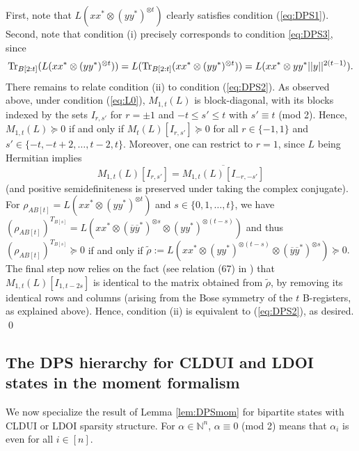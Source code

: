 \documentclass[11pt]{article}
\makeatletter
\newcommand{\N}{\ensuremath{\mathbb{N}}}   %
\newcommand{\Tr}{\text{\rm Tr}}
\newcommand{\oy}{\overline y}
\newcommand{\ot}{\otimes}
\theoremstyle{plain}
\renewenvironment{proof}[1][\proofname]{%
  \par
  \pushQED{}%
  \normalfont
  \topsep6\p@\@plus6\p@
  \trivlist
  \item[\hskip\labelsep\itshape #1\@addpunct{.}]%
}{%
  \popQED
  \endtrivlist
}
\makeatother
\begin{document}
\begin{proof}
First, note that  $L(xx^*\ot (yy^*)^{\ot t})$ clearly satisfies condition (\ref{eq:DPS1}).
Second, note that condition (i) precisely corresponds to condition \eqref{eq:DPS3}, since $$\Tr_{B[2:t]}(L(xx^*\ot(yy^*)^{\ot t}))=L(\Tr_{B[2:t]}(xx^*\ot(yy^*)^{\ot t}))=L(xx^*\ot yy^*||y||^{2(t-1)}).$$
There remains to relate condition (ii) to condition (\ref{eq:DPS2}).
  As observed above,  under condition (\ref{eq:L0}), $M_{1,t}(L)$ is block-diagonal, with its blocks indexed by the sets $I_{r,s'}$ for $r=\pm 1$ and $-t\le s'\le t$ with $s'\equiv t$ (mod 2). Hence,  $M_{1,t}(L)\succeq 0$  if and only if $M_t(L)[I_{r,s'}]\succeq 0$  for all $r\in\{-1,1\}$ and $s'\in\{-t, -t+2,\dots,t-2,t\}$. Moreover, one can  restrict   to $r=1$, since $L$ being Hermitian implies $$M_{1,t}(L)[I_{r,s'}]=\overline{M_{1,t}(L)[I_{-r,-s'}]}$$ (and positive semidefiniteness is preserved under taking the complex conjugate).
For $\rho_{AB[t]}=L(xx^*\ot (yy^*)^{\ot t})$ and $s\in \{0,1,\ldots,t\}$, we have $(\rho_{AB[t]})^{T_{B[s]}}
= L(xx^*\ot (\oy \oy^*)^{\ot s}\ot (yy^*)^{\ot (t-s)})$ and thus $(\rho_{AB[t]})^{T_{B[s]}}
\succeq 0$ if and only if
$\widetilde \rho:= L(xx^*\ot  (yy^*)^{\ot (t-s)} \ot (\oy \oy^*)^{\ot s})\succeq 0.$
The final step now  relies on the fact (see relation (67) in \cite{GLS_2021}) that $M_{1,t}(L)[I_{1,t-2s}]$ is identical to the matrix obtained from $\widetilde\rho$,  
    by removing its identical rows and columns (arising from the Bose symmetry of the $t$ B-registers, as explained above). Hence, condition (ii) is equivalent to (\ref{eq:DPS2}), as desired.
\qed\end{proof}

\subsection{The DPS hierarchy for CLDUI and LDOI states  in the moment formalism}\label{sec:momDPSCLDUI}

We now specialize the result of Lemma \ref{lem:DPSmom} for 
 bipartite states with CLDUI or LDOI sparsity structure. For $\alpha\in \N^n$, $\alpha\equiv 0$ (mod 2) means that $\alpha_i$ is even for all $i\in [n]$.
\end{document}
